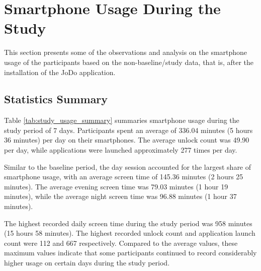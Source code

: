 \documentclass[11pt]{report}
\begin{document}
\section{Smartphone Usage During the Study}

This section presents some of the observations and analysis on the smartphone usage of
the participants based on the non-baseline/study data, that is, after the installation of the JoDo application.

\subsection{Statistics Summary}

Table \ref{tab:study_usage_summary} summaries smartphone usage during the study period of 7 days. 
Participants spent an average of 336.04 minutes (5 hours 36 minutes) per day on their smartphones. 
The average unlock count was 49.90 per day, while applications were launched approximately 277 times per day.

Similar to the baseline period, the day session accounted for the largest share of 
smartphone usage, with an average screen time of 145.36 minutes (2 hours 25 minutes). 
The average evening screen time was 79.03 minutes (1 hour 19 minutes), while the 
average night screen time was 96.88 minutes (1 hour 37 minutes).

The highest recorded daily screen time during the study period was 958 minutes 
(15 hours 58 minutes). The highest recorded unlock count and application launch 
count were 112 and 667 respectively. Compared to the average values, these maximum 
values indicate that some participants continued to record considerably higher usage 
on certain days during the study period.

\begin{table}[H]
\centering
\small
\caption{Summary of Study Phase Smartphone Usage}
\label{tab:study_usage_summary}

\end{table}
\end{document}
